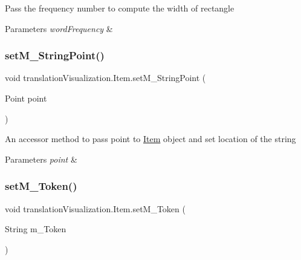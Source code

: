 Pass the frequency number to compute the width of rectangle 
\begin{DoxyParams}{Parameters}
{\em word\+Frequency} & \\
\hline
\end{DoxyParams}
\mbox{\label{classtranslation_visualization_1_1_item_a87bdfdce59224975082ab87d6ff0c38c}} 
\subsubsection{\texorpdfstring{set\+M\+\_\+\+String\+Point()}{setM\_StringPoint()}}
{\footnotesize\ttfamily void translation\+Visualization.\+Item.\+set\+M\+\_\+\+String\+Point (\begin{DoxyParamCaption}\item[{Point}]{point }\end{DoxyParamCaption})\hspace{0.3cm}{\ttfamily [inline]}}

An accessor method to pass point to \hyperlink{classtranslation_visualization_1_1_item}{Item} object and set location of the string 
\begin{DoxyParams}{Parameters}
{\em point} & \\
\hline
\end{DoxyParams}
\mbox{\label{classtranslation_visualization_1_1_item_a84caeb3f91879014422a80f85e603f52}} 
\subsubsection{\texorpdfstring{set\+M\+\_\+\+Token()}{setM\_Token()}}
{\footnotesize\ttfamily void translation\+Visualization.\+Item.\+set\+M\+\_\+\+Token (\begin{DoxyParamCaption}\item[{String}]{m\+\_\+\+Token }\end{DoxyParamCaption})\hspace{0.3cm}{\ttfamily [inline]}}

